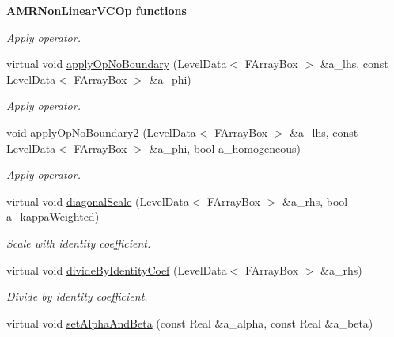 \begin{Indent}{\bf A\-M\-R\-Non\-Linear\-V\-C\-Op functions}
\begin{DoxyCompactItemize}
\begin{DoxyCompactList}\small\item\em Apply operator. \end{DoxyCompactList}\item 
\hypertarget{class_a_m_r_non_linear_v_c_op_ab7ee93671f9ee147209ecec8ed3d95f8}{virtual void \hyperlink{class_a_m_r_non_linear_v_c_op_ab7ee93671f9ee147209ecec8ed3d95f8}{apply\-Op\-No\-Boundary} (Level\-Data$<$ F\-Array\-Box $>$ \&a\-\_\-lhs, const Level\-Data$<$ F\-Array\-Box $>$ \&a\-\_\-phi)}\label{class_a_m_r_non_linear_v_c_op_ab7ee93671f9ee147209ecec8ed3d95f8}

\begin{DoxyCompactList}\small\item\em Apply operator. \end{DoxyCompactList}\item 
\hypertarget{class_a_m_r_non_linear_v_c_op_a1a0649bf51184c96d80719e59de68f14}{void \hyperlink{class_a_m_r_non_linear_v_c_op_a1a0649bf51184c96d80719e59de68f14}{apply\-Op\-No\-Boundary2} (Level\-Data$<$ F\-Array\-Box $>$ \&a\-\_\-lhs, const Level\-Data$<$ F\-Array\-Box $>$ \&a\-\_\-phi, bool a\-\_\-homogeneous)}\label{class_a_m_r_non_linear_v_c_op_a1a0649bf51184c96d80719e59de68f14}

\begin{DoxyCompactList}\small\item\em Apply operator. \end{DoxyCompactList}\item 
\hypertarget{class_a_m_r_non_linear_v_c_op_a1d8179e4ce988c0e9c4fcfb0b8b8275f}{virtual void \hyperlink{class_a_m_r_non_linear_v_c_op_a1d8179e4ce988c0e9c4fcfb0b8b8275f}{diagonal\-Scale} (Level\-Data$<$ F\-Array\-Box $>$ \&a\-\_\-rhs, bool a\-\_\-kappa\-Weighted)}\label{class_a_m_r_non_linear_v_c_op_a1d8179e4ce988c0e9c4fcfb0b8b8275f}

\begin{DoxyCompactList}\small\item\em Scale with identity coefficient. \end{DoxyCompactList}\item 
\hypertarget{class_a_m_r_non_linear_v_c_op_ab31eebdb41dae0e42962b983c4f1e44f}{virtual void \hyperlink{class_a_m_r_non_linear_v_c_op_ab31eebdb41dae0e42962b983c4f1e44f}{divide\-By\-Identity\-Coef} (Level\-Data$<$ F\-Array\-Box $>$ \&a\-\_\-rhs)}\label{class_a_m_r_non_linear_v_c_op_ab31eebdb41dae0e42962b983c4f1e44f}

\begin{DoxyCompactList}\small\item\em Divide by identity coefficient. \end{DoxyCompactList}\item 
\hypertarget{class_a_m_r_non_linear_v_c_op_a9090e8b4e8214c34b3f0cf712fdada6c}{virtual void \hyperlink{class_a_m_r_non_linear_v_c_op_a9090e8b4e8214c34b3f0cf712fdada6c}{set\-Alpha\-And\-Beta} (const Real \&a\-\_\-alpha, const Real \&a\-\_\-beta)}\label{class_a_m_r_non_linear_v_c_op_a9090e8b4e8214c34b3f0cf712fdada6c}


\end{DoxyCompactItemize}
\end{Indent}
